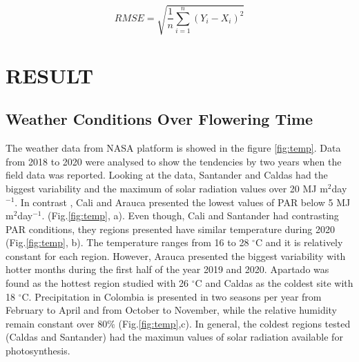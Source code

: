 \documentclass[gene,journal,article,submit,moreauthors,pdftex]{Definitions/mdpi}
\begin{document}
\begin{equation}
RMSE= \sqrt{\frac{1}{n}  \sum_{i=1}^{n} (Y_{i}-X_{i})^{2} } 
\label{equ:RMSE}
\end{equation}



\section{RESULT}

\subsection{Weather Conditions Over Flowering Time }

{\color{olive} The weather data from NASA platform is showed in the figure \ref{fig:temp}. Data from 2018 to 2020 were analysed to show the tendencies by two years when the field data was reported.} Looking at the data, Santander and Caldas had the biggest variability and the maximum of solar radiation values over 20 MJ m$^{2}$day$^{-1}$. In contrast , Cali and Arauca presented the lowest values of PAR below 5 MJ m$^{2}$day$^{-1}$. (Fig.\ref{fig:temp}, a).  Even though, Cali and Santander had contrasting PAR conditions, they regions presented  have similar temperature during 2020 (Fig.\ref{fig:temp}, b). The temperature ranges from 16 to 28 $^\circ$C and it is relatively constant for each region. However, Arauca presented the biggest variability with hotter months during the first half of the year 2019 and 2020.  Apartado was found as the hottest region studied with 26 $^\circ$C and Caldas as the coldest site with 18 $^\circ$C.  Precipitation in Colombia is presented in two seasons per year from February to April and from October to November, while the relative humidity remain constant over 80\% (Fig.\ref{fig:temp},c). In general, the coldest regions tested (Caldas and Santander) had the maximun values of solar radiation available for photosynthesis. 
\end{document}
